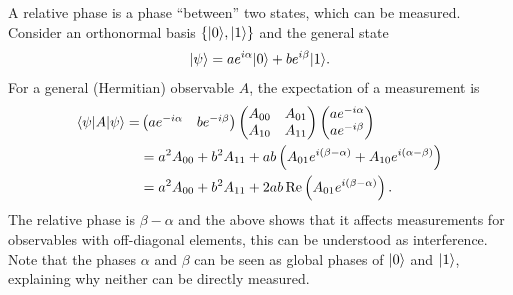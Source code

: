 \documentclass[a4paper,10pt,oneside]{book}
\theoremstyle{plain}
\theoremstyle{definition}
\theoremstyle{remark}
\DeclarePairedDelimiter\bra{\langle}{\rvert}
\DeclarePairedDelimiter\ket{\lvert}{\rangle}
\begin{document}
A relative phase is a phase ``between'' two states, which can be measured. Consider an orthonormal basis $\{\ket{0}, \ket{1}\}$ and the general state
\begin{equation}
  \ket{\psi} = ae^{i\alpha} \ket{0} + be^{i\beta} \ket{1}.
\end{equation}
For a general (Hermitian) observable $A$, the expectation of a measurement is
\begin{equation}
  \begin{aligned}
    \bra{\psi}A\ket{\psi}
    =&
    \begin{pmatrix}
      a e^{-i\alpha} & b e^{-i\beta}
    \end{pmatrix}
    \begin{pmatrix}
      A_{00} & A_{01} \\
      A_{10} & A_{11}
    \end{pmatrix}
    \begin{pmatrix}
      a e^{-i\alpha} \\
      a e^{-i\beta}
    \end{pmatrix} \\
    &= a^2 A_{00} + b^2 A_{11} + ab\left( A_{01}e^{i(\beta-\alpha)} + A_{10}e^{i(\alpha-\beta)} \right) \\
    &= a^2 A_{00} + b^2 A_{11} + 2ab\operatorname{Re}\left( A_{01}e^{i(\beta-\alpha)} \right).
  \end{aligned}
\end{equation}
The relative phase is $\beta-\alpha$ and the above shows that it affects measurements for observables with off-diagonal elements, this can be understood as interference. Note that the phases $\alpha$ and $\beta$ can be seen as global phases of $\ket{0}$ and $\ket{1}$, explaining why neither can be directly measured.
\end{document}
